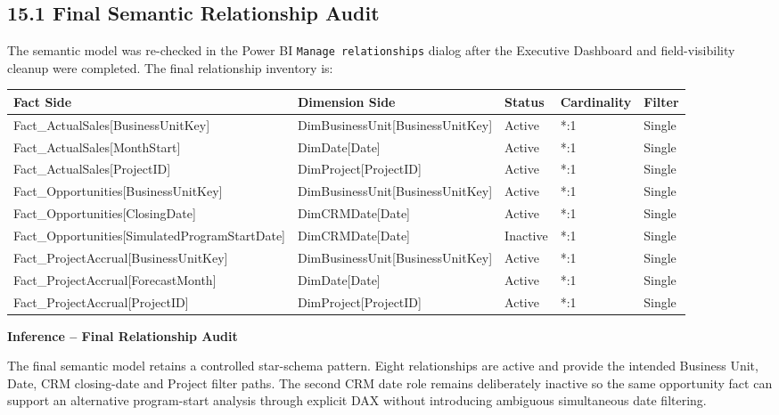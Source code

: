 \documentclass[11pt,a4paper]{article}
\begin{document}
\subsection{15.1 Final Semantic Relationship Audit}

The semantic model was re-checked in the Power BI
\texttt{Manage relationships} dialog after the Executive Dashboard and field-visibility
cleanup were completed. The final relationship inventory is:

\begin{tabularx}{\textwidth}{
    >{\ttfamily\raggedright\arraybackslash}p{4.1cm}
    >{\ttfamily\raggedright\arraybackslash}p{4.1cm}
    >{\centering\arraybackslash}p{1.7cm}
    >{\centering\arraybackslash}p{1.7cm}
    X
}

\toprule
Fact Side
&
Dimension Side
&
Status
&
Cardinality
&
Filter
\\
\midrule

Fact\_ActualSales[BusinessUnitKey]
&
DimBusinessUnit[BusinessUnitKey]
&
Active
&
*:1
&
Single
\\

Fact\_ActualSales[MonthStart]
&
DimDate[Date]
&
Active
&
*:1
&
Single
\\

Fact\_ActualSales[ProjectID]
&
DimProject[ProjectID]
&
Active
&
*:1
&
Single
\\

Fact\_Opportunities[BusinessUnitKey]
&
DimBusinessUnit[BusinessUnitKey]
&
Active
&
*:1
&
Single
\\

Fact\_Opportunities[ClosingDate]
&
DimCRMDate[Date]
&
Active
&
*:1
&
Single
\\

Fact\_Opportunities[SimulatedProgramStartDate]
&
DimCRMDate[Date]
&
Inactive
&
*:1
&
Single
\\

Fact\_ProjectAccrual[BusinessUnitKey]
&
DimBusinessUnit[BusinessUnitKey]
&
Active
&
*:1
&
Single
\\

Fact\_ProjectAccrual[ForecastMonth]
&
DimDate[Date]
&
Active
&
*:1
&
Single
\\

Fact\_ProjectAccrual[ProjectID]
&
DimProject[ProjectID]
&
Active
&
*:1
&
Single
\\

\bottomrule
\end{tabularx}

\begin{inferencebox}
\textbf{Inference -- Final Relationship Audit}

The final semantic model retains a controlled star-schema pattern. Eight relationships
are active and provide the intended Business Unit, Date, CRM closing-date and Project
filter paths. The second CRM date role remains deliberately inactive so the same
opportunity fact can support an alternative program-start analysis through explicit DAX
without introducing ambiguous simultaneous date filtering.
\end{inferencebox}
\end{document}
